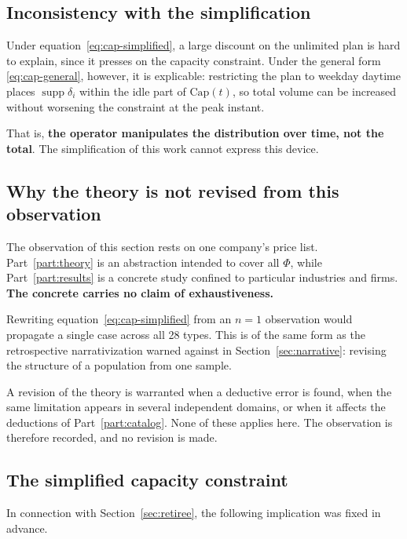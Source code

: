\subsection{Inconsistency with the simplification}

Under equation~\eqref{eq:cap-simplified}, a large discount on the unlimited plan is hard to
explain, since it presses on the capacity constraint. Under the general form
\eqref{eq:cap-general}, however, it is explicable: restricting the plan to weekday daytime places
$\operatorname{supp}\delta_i$ within the idle part of $\mathrm{Cap}(t)$, so total volume can be
increased without worsening the constraint at the peak instant.

That is, \textbf{the operator manipulates the distribution over time, not the total}. The
simplification of this work cannot express this device.

\subsection{Why the theory is not revised from this observation}

\begin{remark}
\label{rem:no-generalization}
The observation of this section rests on one company's price list.
Part~\ref{part:theory} is an abstraction intended to cover all $\Phi$, while
Part~\ref{part:results} is a concrete study confined to particular industries and firms.
\textbf{The concrete carries no claim of exhaustiveness.}

Rewriting equation~\eqref{eq:cap-simplified} from an $n=1$ observation would propagate a single
case across all 28 types. This is of the same form as the retrospective narrativization warned
against in Section~\ref{sec:narrative}: revising the structure of a population from one sample.

A revision of the theory is warranted when a deductive error is found, when the same limitation
appears in several independent domains, or when it affects the deductions of
Part~\ref{part:catalog}. None of these applies here. The observation is therefore recorded, and
no revision is made.
\end{remark}

\subsection{The simplified capacity constraint}

In connection with Section~\ref{sec:retiree}, the following implication was fixed in advance.


